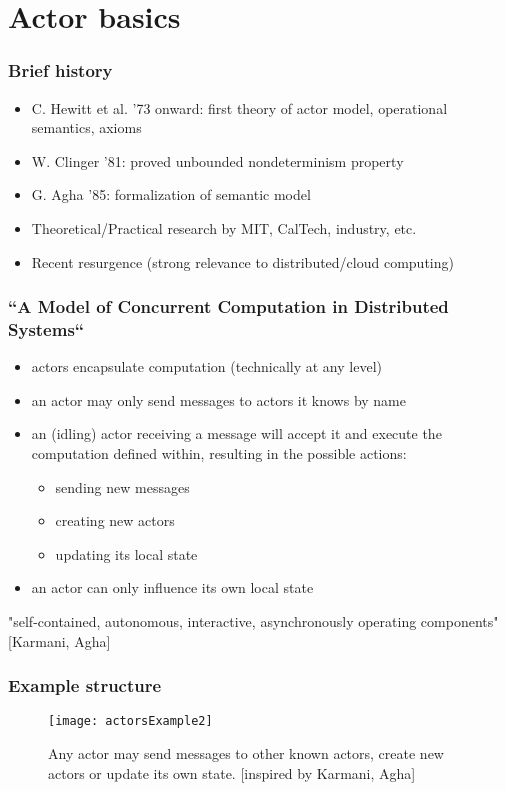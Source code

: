 \section{Actor basics}
\begin{frame}
\frametitle{Brief history}
\begin{itemize}
\item C. Hewitt et al. '73 onward: first theory of actor model, operational semantics, axioms
\item W. Clinger '81: proved unbounded nondeterminism property
\item G. Agha '85: formalization of semantic model
\item Theoretical/Practical research by MIT, CalTech, industry, etc.
\item Recent resurgence (strong relevance to distributed/cloud computing)
\end{itemize}
\end{frame}

\begin{frame}
\frametitle{``A Model of Concurrent Computation in Distributed Systems``}
\begin{itemize}
\item actors encapsulate computation (technically at any level)
\item an actor may only send messages to actors it knows by name
\item an (idling) actor receiving a message will accept it and execute the computation defined within, resulting in the possible actions:
	\begin{itemize}
	\item sending new messages
	\item creating new actors
	\item updating its local state
	\end{itemize}
\item an actor can only influence its own local state
\end{itemize}
\textrightarrow "self-contained, autonomous, interactive, asynchronously operating components" [Karmani, Agha]
\end{frame}

\begin{frame}
\frametitle{Example structure}
\begin{figure}
\centerline{
\texttt{[image: actorsExample2]}
}
\caption{Any actor may send messages to other known actors, create new actors or update its own state. [inspired by Karmani, Agha]}
\label{Actors}
\end{figure}
\end{frame}

